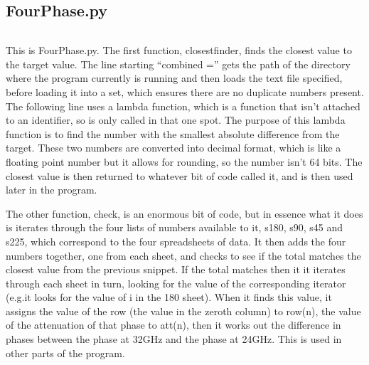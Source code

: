 \documentclass{article}
\newcommand{\q}[1]{``#1''}
\begin{document}
\subsection{FourPhase.py}
\inputminted[linenos, breaklines]{python}{../FourPhase.py}
This is FourPhase.py. The first function, closestfinder, finds the closest value to the target value. The line starting \q{combined =} gets the path of the directory where the program
currently is running and then loads the text file specified, before loading it into a set, which ensures there are no duplicate numbers present. The following line uses
a lambda function, which is a function that isn't attached to an identifier, so is only called in that one spot. The purpose of this lambda function is to find the
number with the smallest absolute difference from the target. These two numbers are converted into decimal format, which is like a floating point number but it allows
for rounding, so the number isn't 64 bits. The closest value is then returned to whatever bit of code called it, and is then used later in the program.\par
The other function, check, is an enormous bit of code, but in essence what it does is iterates through the four lists of numbers available to it, s180, s90, s45 and s225,
which correspond to the four spreadsheets of data. It then adds the four numbers together, one from each sheet, and checks to see if the total matches
the closest value from the previous snippet. If the total matches then it it iterates through each sheet in turn, looking for the value of the corresponding
iterator (e.g.it looks for the value of i in the 180 sheet). When it finds this value, it assigns the value of the row (the value in the zeroth column) to row(n),
the value of the attenuation of that phase to att(n), then it works out the difference in phases between the phase at 32GHz and the phase at 24GHz. This is used
in other parts of the program.
\end{document}
